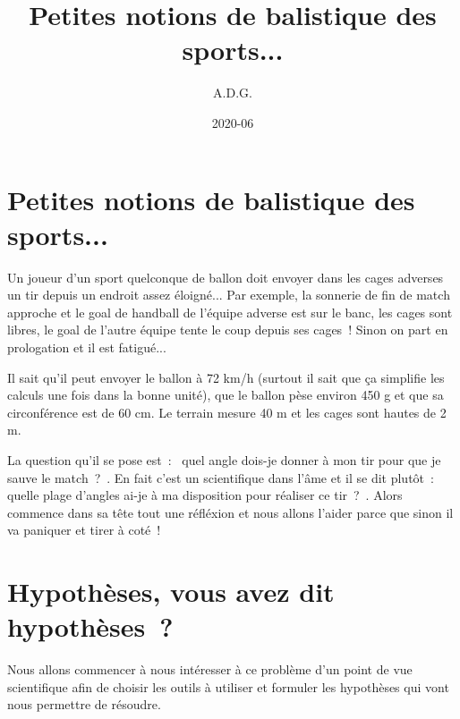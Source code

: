 \documentclass[french,a4paper,10pt]{article}
\title{Petites notions de balistique des sports...}
\date{2020-06}
\author{A.D.G.}
\begin{document}
\section*{Petites notions de balistique des sports...}

Un joueur d’un sport quelconque de ballon doit envoyer dans les cages adverses un tir depuis un endroit assez éloigné... Par exemple, la sonnerie de fin de match approche et le goal de handball de l’équipe adverse est sur le banc, les cages sont libres, le goal de l’autre équipe tente le coup depuis ses cages ! Sinon on part en prologation et il est fatigué...

Il sait qu’il peut envoyer le ballon à 72 km/h (surtout il sait que ça simplifie les calculs une fois dans la bonne unité), que le ballon pèse environ 450 g et que sa circonférence est de 60 cm. Le terrain mesure 40 m et les cages sont hautes de 2 m. 

La question qu’il se pose est : \og quel angle dois-je donner à mon tir pour que je sauve le match ? \fg{}. En fait c’est un scientifique dans l’âme et il se dit plutôt : \og quelle plage d’angles ai-je à ma disposition pour réaliser ce tir ? \fg{}. Alors commence dans sa tête tout une réfléxion et nous allons l’aider parce que sinon il va paniquer et tirer à coté !

\section{Hypothèses, vous avez dit hypothèses ?}
Nous allons commencer à nous intéresser à ce problème d'un point de vue scientifique afin de choisir les outils à utiliser et formuler les hypothèses qui vont nous permettre de résoudre.\\
\end{document}

